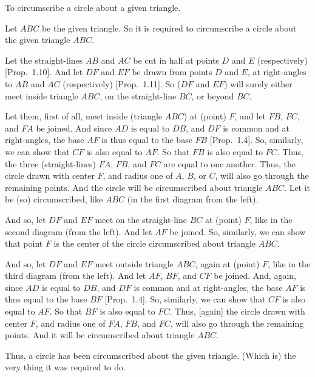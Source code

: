 \begin{Parallel}{}{}
{To circumscribe a circle about a given  triangle.

\epsfysize=1.05in
\centerline{}

Let $ABC$ be the given triangle. So it is required to circumscribe
a circle about the given triangle $ABC$.

Let the straight-lines $AB$ and $AC$ be cut in half at points $D$ and $E$ (respectively) [Prop.~1.10]. And let $DF$ and $EF$ be drawn from 
points $D$ and $E$, at right-angles to $AB$ and $AC$ (respectively) [Prop.~1.11].
So  ($DF$ and $EF$) will surely either meet inside triangle $ABC$, on the straight-line
$BC$, or beyond $BC$.

Let them, first of all, meet inside (triangle $ABC$) at (point) $F$, and let $FB$, 
$FC$, and $FA$ be joined. And since $AD$ is equal to $DB$, and $DF$ is
common and at right-angles, the base $AF$ is thus equal to the base $FB$
[Prop.~1.4]. So, similarly, we can show that $CF$ is also equal to
$AF$. So that $FB$ is also equal to $FC$. Thus, the three (straight-lines)
$FA$, $FB$, and $FC$ are equal to one another. Thus, the circle drawn with
center $F$, and radius one of $A$, $B$, or $C$, will also go through the remaining points.
And the circle will be circumscribed about triangle $ABC$. Let it
be (so) circumscribed, like $ABC$ (in the first diagram from the left).

And so, let $DF$ and $EF$ meet on the straight-line $BC$ at (point) $F$, like
in the second diagram (from the left). And let $AF$ be joined.
So, similarly, we can show that point $F$ is the center of the circle circumscribed about triangle $ABC$.

And so, let $DF$ and $EF$ meet outside triangle $ABC$, again at (point) $F$, like
in the third diagram (from the left). And let $AF$, $BF$, and $CF$ be joined.
And, again, since $AD$ is equal to $DB$, and $DF$ is common and at right-angles,
the base $AF$ is thus equal to the base $BF$ [Prop.~1.4]. So, similarly,
we can show that $CF$ is also equal to $AF$. So that $BF$ is also equal to $FC$.
Thus, [again] the circle drawn with center $F$, and radius one of $FA$, $FB$, and
$FC$, will also go through the remaining points. And it will be circumscribed
about triangle $ABC$.

Thus, a circle has been circumscribed about the given triangle. (Which is)
the very thing it was required to do.}
\end{Parallel}

